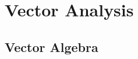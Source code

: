 \documentclass[a4paper]{article}
\begin{document}
    \section{Vector Analysis}
    \subsection{Vector Algebra}
    
    
    
\end{document}
